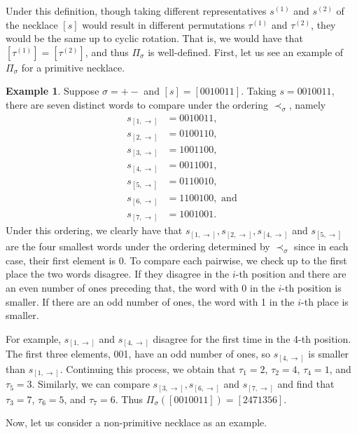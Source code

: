 \documentclass[12pt]{article}
\theoremstyle{plain}
\theoremstyle{definition}
\newtheorem{example}[theorem]{Example}
\begin{document}
Under this definition, though taking different representatives $s^{(1)}$ and $s^{(2)}$ of the necklace $[s]$ would result in different permutations $\tau^{(1)}$ and $\tau^{(2)}$, they would be the same up to cyclic rotation. That is, we would have that $[\tau^{(1)}]=[\tau^{(2)}]$, and thus $\Pi_\sigma$ is well-defined. First, let us see an example of $\Pi_\sigma$ for a primitive necklace. 
\begin{example}\label{ex: prim}
Suppose $\sigma=+-$ and $[s]=[0010011]$. Taking $s=0010011$, there are seven distinct words to compare under the ordering $\prec_\sigma$, namely
\begin{align*}
s_{[1,\rightarrow]}& = 0010011, \\
s_{[2,\rightarrow]}& = 0100110, \\
s_{[3,\rightarrow]}& = 1001100, \\
s_{[4,\rightarrow]}& = 0011001, \\
s_{[5,\rightarrow]}& = 0110010, \\
s_{[6,\rightarrow]}& = 1100100, \text{ and} \\
s_{[7,\rightarrow]}& = 1001001. 
\end{align*}
Under this ordering, we clearly have that $s_{[1,\rightarrow]}, s_{[2,\rightarrow]}, s_{[4,\rightarrow]}$ and $s_{[5,\rightarrow]}$ are the four smallest words under the ordering determined by $\prec_\sigma$ since in each case, their first element is 0. To compare each pairwise, we check up to the first place the two words disagree. If they disagree in the $i$-th position and there are an even number of ones preceding that, the word with 0 in the $i$-th position is smaller. If there are an odd number of ones, the word with 1 in the $i$-th place is smaller. 

For example,  $s_{[1,\rightarrow]}$ and  $s_{[4,\rightarrow]}$ disagree for the first time in the 4-th position. The first three elements, 001, have an odd number of ones, so $s_{[4,\rightarrow]}$ is smaller than $s_{[1,\rightarrow]}$. %
Continuing this process, we obtain that $\tau_1=2$, $\tau_2=4$, $\tau_4=1$, and $\tau_5=3$. 
Similarly, we can compare $ s_{[3,\rightarrow]}, s_{[6,\rightarrow]}$ and $s_{[7,\rightarrow]}$ and find that $\tau_3=7$, $\tau_6=5$, and $\tau_7=6$. 
Thus $\Pi_\sigma([0010011]) = [2471356]$. 
\end{example}
Now, let us consider a non-primitive necklace as an example.
\end{document}

